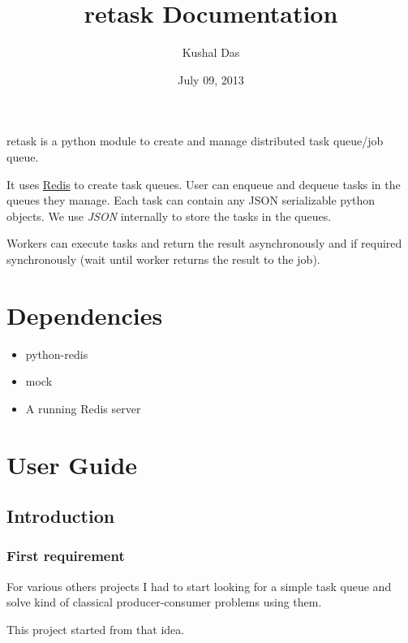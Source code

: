 \documentclass[letterpaper,10pt,english]{sphinxmanual}
\title{retask Documentation}
\date{July 09, 2013}
\author{Kushal Das}
\begin{document}
\maketitle
\tableofcontents
{}\label{index::doc}


retask is a python module to create and manage distributed task queue/job queue.

It uses \href{http://redis.io}{Redis} to create task queues. User can enqueue
and dequeue tasks in the queues they manage. Each task can contain any JSON
serializable python objects. We use \emph{JSON} internally to store the tasks
in the queues.

Workers can execute tasks and return the result asynchronously and if required
synchronously (wait until worker returns the result to the job).


\chapter{Dependencies}
\label{index:dependencies}\label{index:retask-simple-task-queue}\begin{itemize}
\item {} 
python-redis

\item {} 
mock

\item {} 
A running Redis server

\end{itemize}


\chapter{User Guide}
\label{index:user-guide}

\section{Introduction}
\label{user/intro:introduction}\label{user/intro::doc}\label{user/intro:id1}

\subsection{First requirement}
\label{user/intro:first-requirement}
For various others projects I had to start looking for a
simple task queue and solve kind of classical producer-consumer problems
using them.

This project started from that idea.
\end{document}
